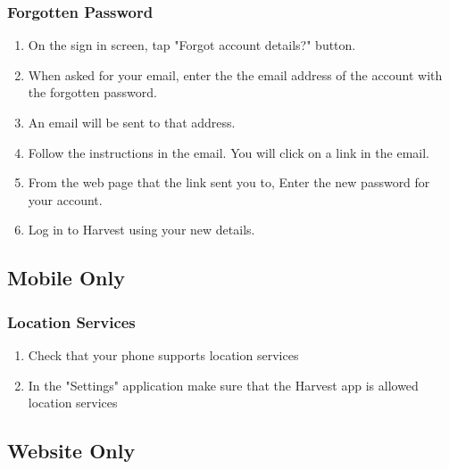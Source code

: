 \documentclass[11pt]{article}
\begin{document}
\subsubsection{Forgotten Password}
\begin{enumerate}
\item On the sign in screen, tap "Forgot account details?" button.
\item When asked for your email, enter the the email address of the account with the forgotten password.
\item An email will be sent to that address.
\item Follow the instructions in the email. You will click on a link in the email.
\item From the web page that the link sent you to, Enter the new password for your account.
\item Log in to Harvest using your new details.
\end{enumerate}

\subsection{Mobile Only}
\subsubsection{Location Services}
\begin{enumerate}
\item Check that your phone supports location services
\item In the "Settings" application make sure that the Harvest app is allowed location services 
\end{enumerate}

\subsection{Website Only}
\end{document}

